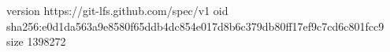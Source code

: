 version https://git-lfs.github.com/spec/v1
oid sha256:e0d1da563a9e8580f65ddb4dc854e017d8b6c379db80ff17ef9c7cd6c801fcc9
size 1398272
